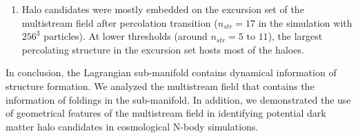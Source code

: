 \begin{enumerate}
\item Halo candidates were mostly embedded on the excursion set of the multistream field after percolation transition ($n_{str} = 17$ in the simulation with $256^3$ particles). At lower thresholds (around $n_{str} = 5 \text{ to } 11$), the largest percolating structure in the excursion set hosts most of the haloes.     

\end{enumerate}

In conclusion, the Lagrangian sub-manifold contains dynamical information of structure formation. We analyzed the multistream field that contains the information of foldings in the sub-manifold. In addition, we demonstrated the use of geometrical features of the multistream field in identifying potential dark matter halo candidates in cosmological N-body simulations. 


% 


